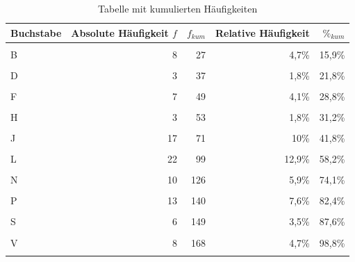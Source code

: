\documentclass[
  11pt,
  ngerman,
  a4paper,
]{report}
\begin{document}
\begin{table}
\caption{\label{tab:haeufkum}Tabelle mit kumulierten Häufigkeiten}
\centering
\begin{tabular}[t]{lrrrr}
\toprule
\textbf{Buchstabe} & \textbf{Absolute Häufigkeit $f$} & \textbf{$f_{kum}$} & \textbf{Relative Häufigkeit} & \textbf{$\%_{kum}$}\\
\midrule
\cellcolor{gray!6}{A} & \cellcolor{gray!6}{19} & \cellcolor{gray!6}{19} & \cellcolor{gray!6}{11,2\%} & \cellcolor{gray!6}{11,2\%}\\
B & 8 & 27 & 4,7\% & 15,9\%\\
\cellcolor{gray!6}{C} & \cellcolor{gray!6}{7} & \cellcolor{gray!6}{34} & \cellcolor{gray!6}{4,1\%} & \cellcolor{gray!6}{20\%}\\
D & 3 & 37 & 1,8\% & 21,8\%\\
\cellcolor{gray!6}{E} & \cellcolor{gray!6}{5} & \cellcolor{gray!6}{42} & \cellcolor{gray!6}{2,9\%} & \cellcolor{gray!6}{24,7\%}\\
F & 7 & 49 & 4,1\% & 28,8\%\\
\cellcolor{gray!6}{G} & \cellcolor{gray!6}{1} & \cellcolor{gray!6}{50} & \cellcolor{gray!6}{0,6\%} & \cellcolor{gray!6}{29,4\%}\\
H & 3 & 53 & 1,8\% & 31,2\%\\
\cellcolor{gray!6}{I} & \cellcolor{gray!6}{1} & \cellcolor{gray!6}{54} & \cellcolor{gray!6}{0,6\%} & \cellcolor{gray!6}{31,8\%}\\
J & 17 & 71 & 10\% & 41,8\%\\
\cellcolor{gray!6}{K} & \cellcolor{gray!6}{6} & \cellcolor{gray!6}{77} & \cellcolor{gray!6}{3,5\%} & \cellcolor{gray!6}{45,3\%}\\
L & 22 & 99 & 12,9\% & 58,2\%\\
\cellcolor{gray!6}{M} & \cellcolor{gray!6}{17} & \cellcolor{gray!6}{116} & \cellcolor{gray!6}{10\%} & \cellcolor{gray!6}{68,2\%}\\
N & 10 & 126 & 5,9\% & 74,1\%\\
\cellcolor{gray!6}{O} & \cellcolor{gray!6}{1} & \cellcolor{gray!6}{127} & \cellcolor{gray!6}{0,6\%} & \cellcolor{gray!6}{74,7\%}\\
P & 13 & 140 & 7,6\% & 82,4\%\\
\cellcolor{gray!6}{R} & \cellcolor{gray!6}{3} & \cellcolor{gray!6}{143} & \cellcolor{gray!6}{1,8\%} & \cellcolor{gray!6}{84,1\%}\\
S & 6 & 149 & 3,5\% & 87,6\%\\
\cellcolor{gray!6}{T} & \cellcolor{gray!6}{11} & \cellcolor{gray!6}{160} & \cellcolor{gray!6}{6,5\%} & \cellcolor{gray!6}{94,1\%}\\
V & 8 & 168 & 4,7\% & 98,8\%\\
\cellcolor{gray!6}{Y} & \cellcolor{gray!6}{2} & \cellcolor{gray!6}{170} & \cellcolor{gray!6}{1,2\%} & \cellcolor{gray!6}{100\%}\\
\bottomrule
\end{tabular}
\end{table}
\end{document}
